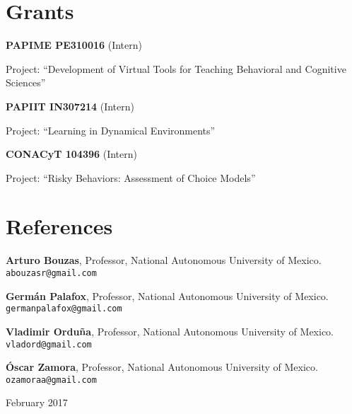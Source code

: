 \documentclass[letterpaper]{article}
\renewenvironment{itemize}{
  \begin{list}{}{
    \setlength{\leftmargin}{1.5em}
  }
}{
  \end{list}
}
\newcommand\textline[4][t]{%
  \par\smallskip\indent\parbox[#1]{.7\textwidth}{\raggedright\texttt{}#2}%
  \parbox[#1]{.05\textwidth}{\raggedright#3}%
  \parbox[#1]{.25\textwidth}{\raggedleft{#4}}\par%
}
\begin{document}
\section*{Grants}
\begin{itemize}
\setlength\itemsep{-.25em}
\setlength{\itemindent}{-.125in}
	\item \textline{{\bf PAPIME PE310016} (Intern)}{\hspace{1pt}}{2015} 
	\item {Project: ``Development of Virtual Tools for Teaching Behavioral and Cognitive Sciences''}
	\item \textline{{\bf PAPIIT IN307214} (Intern)}{\hspace{1pt}}{2014} 
	\item {Project: ``Learning in Dynamical Environments''}
	\item \textline{{\bf CONACyT 104396} (Intern)}{\hspace{1pt}}{2011} 
	\item {Project: ``Risky Behaviors: Assessment of Choice Models''}
\end{itemize}





\section*{References}
\begin{itemize}
\setlength\itemsep{-.25em}
\setlength{\itemindent}{-.125in}
	\item{\bf Arturo Bouzas}, Professor, National Autonomous University of Mexico. {\tt abouzasr@gmail.com}
	\item{\bf Germán Palafox}, Professor, National Autonomous University of Mexico. {\tt germanpalafox@gmail.com}
	\item{\bf Vladimir Orduña}, Professor, National Autonomous University of Mexico. {\tt vladord@gmail.com}
	\item{\bf Óscar Zamora}, Professor, National Autonomous University of Mexico. {\tt ozamoraa@gmail.com}
\end{itemize}

\bigskip
\begin{center}
  \begin{footnotesize}
    February 2017 \\
  \end{footnotesize}
\end{center}
\end{document}
